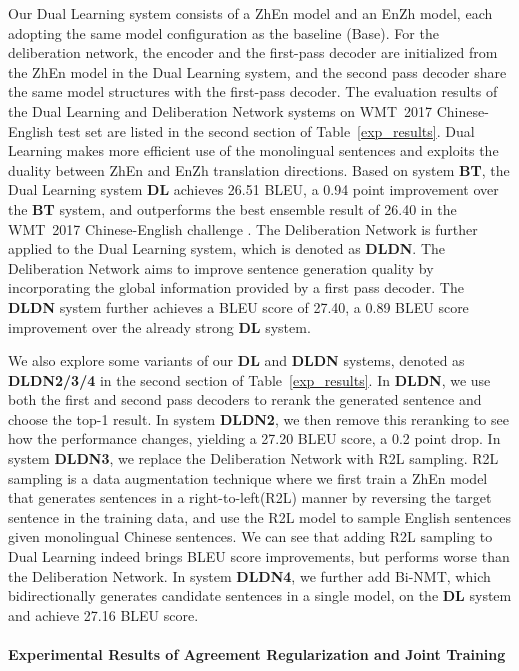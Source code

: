 \documentclass[a4paper]{article}
\begin{document}
\begin{CJK*}{UTF8}{gbsn}
Our Dual Learning system consists of a ZhEn model and an EnZh model, each adopting the same model configuration as the baseline (Base). For the deliberation network, the encoder and the first-pass decoder are initialized from the ZhEn model in the Dual Learning system, and the second pass decoder share the same model structures with the first-pass decoder. 
The evaluation results of the Dual Learning and Deliberation Network systems on WMT~2017 Chinese-English test set are listed in the second section of Table~\ref{exp_results}. Dual Learning makes more efficient use of the monolingual sentences and exploits the duality between ZhEn and EnZh translation directions. Based on system \textbf{BT}, the Dual Learning system \textbf{DL} achieves 26.51 BLEU, a 0.94 point improvement over the \textbf{BT} system, and outperforms the best ensemble result of 26.40 in the WMT~2017 Chinese-English challenge . The Deliberation Network is further applied to the Dual Learning system, which is denoted as \textbf{DLDN}. The Deliberation Network aims to improve sentence generation quality by incorporating the global information provided by a first pass decoder. The \textbf{DLDN} system further achieves a BLEU score of 27.40, a 0.89 BLEU score improvement over the already strong \textbf{DL} system.

We also explore some variants of our \textbf{DL} and \textbf{DLDN} systems, denoted as \textbf{DLDN2/3/4} in the second section of Table~\ref{exp_results}. 
In \textbf{DLDN}, we use both the first and second pass decoders to rerank the generated sentence and choose the top-1 result. In system \textbf{DLDN2}, we then remove this reranking to see how the performance changes, yielding a 27.20 BLEU score, a 0.2 point drop. In system \textbf{DLDN3}, we replace the Deliberation Network with R2L sampling. R2L sampling is a data augmentation technique where we first train a ZhEn model that generates sentences in a right-to-left(R2L) manner by reversing the target sentence in the training data, and use the R2L model to sample English sentences given monolingual Chinese sentences. We can see that adding R2L sampling to Dual Learning indeed brings BLEU score improvements, but performs worse than the Deliberation Network. In system \textbf{DLDN4}, we further add Bi-NMT, which bidirectionally generates candidate sentences in a single model, on the \textbf{DL} system and achieve 27.16 BLEU score.

\paragraph{Experimental Results of Agreement Regularization and Joint Training}\mbox{}\\


\end{CJK*}
\end{document}
